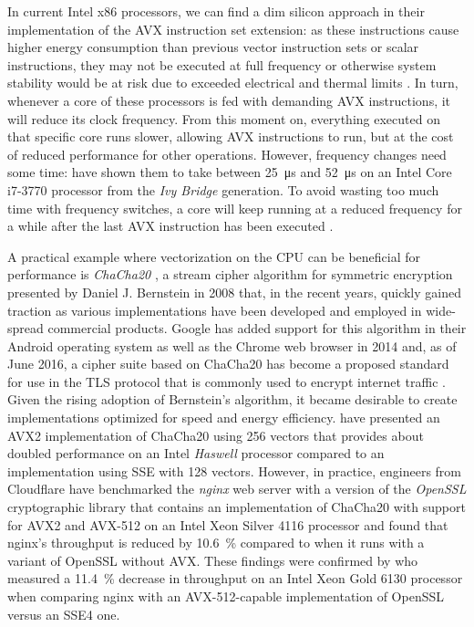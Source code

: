 In current Intel x86 processors, we can find a dim silicon approach in their implementation of the \gls{AVX} instruction set extension: as these instructions cause higher energy consumption than previous vector instruction sets or scalar instructions, they may not be executed at full frequency or otherwise system stability would be at risk due to exceeded electrical and thermal limits \cite{inteloptimizationmanual}. In turn, whenever a core of these processors is fed with demanding \gls{AVX} instructions, it will reduce its clock frequency. From this moment on, everything executed on that specific core runs slower, allowing \gls{AVX} instructions to run, but at the cost of reduced performance for other operations. However, frequency changes need some time: \citeauthor{mazouz2014evaluation} \cite{mazouz2014evaluation} have shown them to take between \SI{25}{\micro\second} and \SI{52}{\micro\second} on an Intel Core i7-3770 processor from the \textit{Ivy Bridge} generation. To avoid wasting too much time with frequency switches, a core will keep running at a reduced frequency for a while after the last \gls{AVX} instruction has been executed \cite{inteloptimizationmanual}.

A practical example where vectorization on the \gls{CPU} can be beneficial for performance is \emph{ChaCha20} \cite{bernstein2008chacha}, a stream cipher algorithm for symmetric encryption presented by Daniel J. Bernstein in 2008 that, in the recent years, quickly gained traction as various implementations have been developed and employed in wide-spread commercial products. Google has added support for this algorithm in their Android operating system as well as the Chrome web browser in 2014 \cite{googlechacha20} and, as of June 2016, a cipher suite based on ChaCha20 has become a proposed standard for use in the \gls{TLS} protocol that is commonly used to encrypt internet traffic \cite{rfc7905}. Given the rising adoption of Bernstein's algorithm, it became desirable to create implementations optimized for speed and energy efficiency. \citeauthor{goll2014vectorization} \cite{goll2014vectorization} have presented an \gls{AVX2} implementation of ChaCha20 using \SI{256}{\bit} vectors that provides about doubled performance on an Intel \textit{Haswell} processor compared to an implementation using \gls{SSE} with \SI{128}{\bit} vectors. However, in practice, engineers from Cloudflare \cite{cloudflareinteldangers} have benchmarked the \emph{nginx} web server with a version of the \emph{OpenSSL} cryptographic library that contains an implementation of ChaCha20 with support for \gls{AVX2} and \gls{AVX-512} on an Intel Xeon Silver 4116 processor and found that nginx's throughput is reduced by \SI{10.6}{\percent} compared to when it runs with a variant of OpenSSL without \gls{AVX}. These findings were confirmed by \citeauthor{gottschlag19sfma} \cite{gottschlag19sfma} who measured a \SI{11.4}{\percent} decrease in throughput on an Intel Xeon Gold 6130 processor when comparing nginx with an \gls{AVX-512}-capable implementation of OpenSSL versus an \gls{SSE}4 one.

